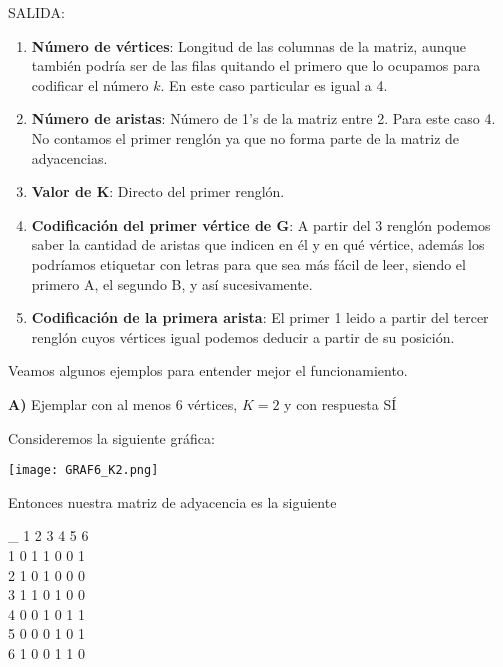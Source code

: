\documentclass[12pt,letterpaper]{article}
\begin{document}
SALIDA:
\begin{enumerate}
    \item \textbf{Número de vértices}: Longitud de las columnas de la matriz, aunque también podría ser de las filas quitando el primero que lo ocupamos para codificar el número $k$. En este caso particular es igual a 4.%
    
    \item \textbf{Número de aristas}: Número de 1's de la matriz entre 2. Para este caso 4. No contamos el primer renglón ya que no forma parte de la matriz de adyacencias.
    
    \item \textbf{Valor de K}: Directo del primer renglón.
    
    \item \textbf{Codificación del primer vértice de G}: A partir del 3 renglón podemos saber la cantidad de aristas que indicen en él y en qué vértice, además los podríamos etiquetar con letras para que sea más fácil de leer, siendo el primero A, el segundo B, y así sucesivamente.%
    
    \item \textbf{Codificación de la primera arista}: El primer 1 leido a partir del tercer renglón cuyos vértices igual podemos deducir a partir de su posición. %
\end{enumerate}

Veamos algunos ejemplos para entender mejor el funcionamiento.

\textbf{A)} Ejemplar con al menos 6 vértices, $K = 2$ y con respuesta SÍ

Consideremos la siguiente gráfica:

\begin{center}
    \texttt{[image: GRAF6\_K2.png]}
\end{center}

Entonces nuestra matriz de adyacencia es la siguiente

\begin{center}
\_ 1 2 3 4 5 6\\
1  0 1 1 0 0 1\\
2  1 0 1 0 0 0\\
3  1 1 0 1 0 0\\
4  0 0 1 0 1 1\\
5  0 0 0 1 0 1\\
6  1 0 0 1 1 0\\
\end{center}
\end{document}
